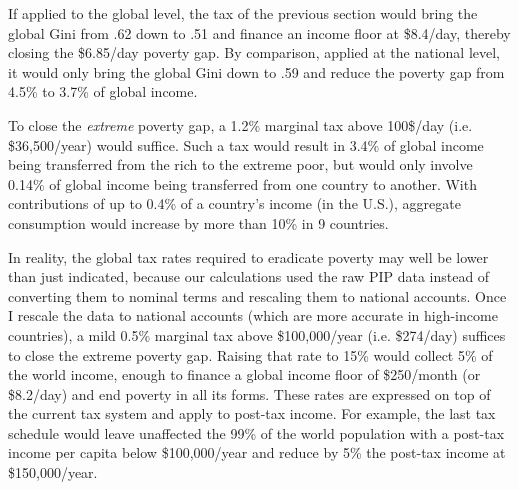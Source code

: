 If applied to the global level, the tax of the previous section would bring the global Gini from .62 down to .51 and finance an income floor at \$8.4/day, thereby closing the \$6.85/day poverty gap. By comparison, applied at the national level, it would only bring the global Gini down to .59 and reduce the poverty gap from 4.5\% to 3.7\% of global income. 

To close the \textit{extreme} poverty gap, a 1.2\% marginal tax above 100\$/day (i.e. \$36,500/year) would suffice. %
Such a tax would result in 3.4\% of global income being transferred from the rich to the extreme poor, but would only involve 0.14\% of global income being transferred from one country to another. 
With contributions of up to 0.4\% of a country's income (in the U.S.), aggregate consumption would increase by more than 10\% in 9 countries. 

In reality, the global tax rates required to eradicate poverty may well be lower than just indicated, because our calculations used the raw PIP data instead of converting them to nominal terms and rescaling them to national accounts. Once I rescale the data to national accounts (which are more accurate in high-income countries), a mild 0.5\% marginal tax above \$100,000/year (i.e. \$274/day) suffices to close the extreme poverty gap. Raising that rate to 15\% would collect 5\% of the world income, enough to finance a global income floor of \$250/month (or \$8.2/day) and end poverty in all its forms. 
These rates are expressed on top of the current tax system and apply to post-tax income. For example, the last tax schedule would leave unaffected the 99\% of the world population with a post-tax income per capita below \$100,000/year and reduce by 5\% the post-tax income at \$150,000/year. 

